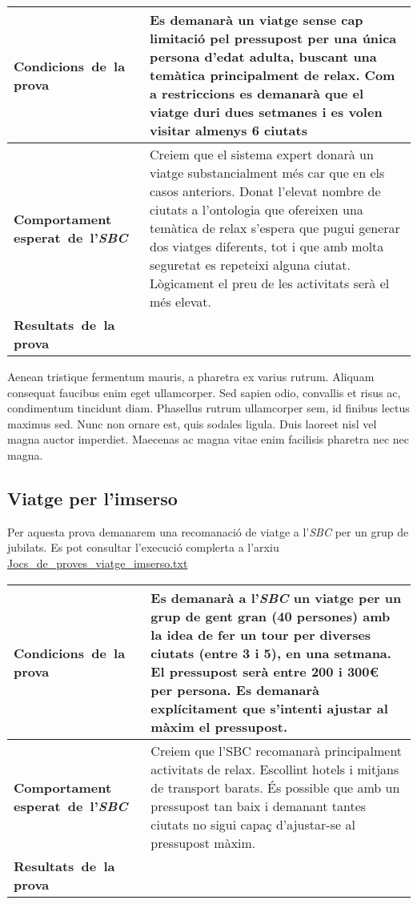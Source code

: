 \documentclass[11pt,a4paper]{article}
\begin{document}
\noindent
\begin{tabular}{|p{}|p{}|}

\hline
\textbf{\mbox{Condicions de la} \mbox{prova}} & Es demanarà un viatge sense cap limitació pel pressupost per una única persona d'edat adulta, buscant una temàtica principalment de relax. Com a restriccions es demanarà que el viatge duri dues setmanes i es volen visitar almenys 6 ciutats\\
\hline
\textbf{Comportament \mbox{esperat de l'\emph{SBC}}} & Creiem que el sistema expert donarà un viatge substancialment més car que en els casos anteriors. Donat l'elevat nombre de ciutats a l'ontologia que ofereixen una temàtica de relax s'espera que pugui generar dos viatges diferents, tot i que amb molta seguretat es repeteixi alguna ciutat. Lògicament el preu de les activitats serà el més elevat.\\
\hline
\textbf{\mbox{Resultats de la} \mbox{prova}} & \\
\hline
\end{tabular}
\medskip

Aenean tristique fermentum mauris, a pharetra ex varius rutrum. Aliquam consequat faucibus enim eget ullamcorper. Sed sapien odio, convallis et risus ac, condimentum tincidunt diam. Phasellus rutrum ullamcorper sem, id finibus lectus maximus sed. Nunc non ornare est, quis sodales ligula. Duis laoreet nisl vel magna auctor imperdiet. Maecenas ac magna vitae enim facilisis pharetra nec nec magna.

\subsection{Viatge per l'imserso}
Per aquesta prova demanarem una recomanació de viatge a l'\emph{SBC} per un grup de jubilats. Es pot consultar l'execució complerta a l'arxiu \url{Jocs_de_proves_viatge_imserso.txt} \\

\noindent
\begin{tabular}{|p{}|p{}|}
\hline
\textbf{\mbox{Condicions de la} \mbox{prova}} & Es demanarà a l'\emph{SBC} un viatge per un grup de gent gran (40 persones) amb la idea de fer un tour per diverses ciutats (entre 3 i 5), en una setmana. El pressupost serà entre 200 i 300\euro{} per persona. Es demanarà explícitament que s'intenti ajustar al màxim el pressupost.\\
\hline
\textbf{Comportament \mbox{esperat de l'\emph{SBC}}} & Creiem que l'SBC recomanarà principalment activitats de relax. Escollint hotels i mitjans de transport barats. És possible que amb un pressupost tan baix i demanant tantes ciutats no sigui capaç d'ajustar-se al pressupost màxim.\\
\hline
\textbf{\mbox{Resultats de la} \mbox{prova}} & \\
\hline
\end{tabular}
\medskip
\end{document}
